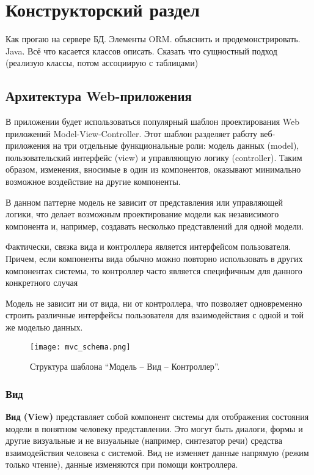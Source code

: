 \chapter{Конструкторский раздел}
Как прогаю на сервере БД. Элементы ORM. объяснить и продемонстрировать. Java. Всё что касается классов описать. Сказать что сущностный подход (реализую классы, потом ассоциирую с таблицами)

\section{Архитектура Web-приложения}
В приложении будет использоваться популярный шаблон проектирования Web приложений Model-View-Controller. Этот шаблон разделяет работу веб-приложения на три отдельные функциональные роли: модель данных (model), пользовательский интерфейс (view) и управляющую логику (controller). Таким образом, изменения, вносимые в один из компонентов, оказывают минимально возможное воздействие на другие компоненты.

В данном паттерне модель не зависит от представления или управляющей логики, что делает возможным проектирование модели как независимого компонента и, например, создавать несколько представлений для одной модели.

Фактически, связка вида и контроллера является интерфейсом пользователя. Причем, если компоненты вида обычно можно повторно использовать в других компонентах системы, то контроллер часто является специфичным для данного конкретного случая

Модель не зависит ни от вида, ни от контроллера, что позволяет одновременно строить различные интерфейсы пользователя для взаимодействия с одной и той же моделью данных.

\begin{figure}[h]
  \centering
  \texttt{[image: mvc\_schema.png]}
  \caption{ Структура шаблона “Модель – Вид – Контроллер”.}
\end{figure}

\subsection{Вид}

\textbf{Вид (View)} представляет собой компонент системы для отображения состояния модели в понятном человеку представлении. Это могут быть диалоги, формы и другие визуальные и не визуальные (например, синтезатор речи) средства взаимодействия человека с системой. Вид не изменяет данные напрямую (режим только чтение), данные изменяются при помощи контроллера.


